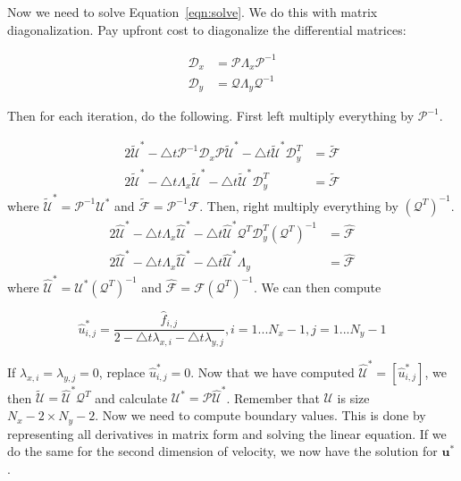 \documentclass[12pt]{article}
\begin{document}
Now we need to solve Equation~\ref{eqn:solve}. We do this with matrix diagonalization. Pay upfront cost to diagonalize the differential matrices:

\begin{align*}
    \mathcal{D}_x &= \mathcal{P}\Lambda_x \mathcal{P}^{-1} \\
    \mathcal{D}_y &= \mathcal{Q}\Lambda_y \mathcal{Q}^{-1}
\end{align*}

Then for each iteration, do the following. First left multiply everything by $\mathcal{P}^{-1}$.

\begin{align*}
    2\tilde{\mathcal{U}}^* - \bigtriangleup t \mathcal{P}^{-1}\mathcal{D}_x \mathcal{P} \tilde{\mathcal{U}}^* - \bigtriangleup t \tilde{\mathcal{U}}^* \mathcal{D}_y^T &= \tilde{\mathcal{F}} \\
    2\tilde{\mathcal{U}}^* - \bigtriangleup t \Lambda_x \tilde{\mathcal{U}}^* - \bigtriangleup t \tilde{\mathcal{U}}^* \mathcal{D}_y^T &= \tilde{\mathcal{F}}
\end{align*}
where $\tilde{\mathcal{U}}^* = \mathcal{P}^{-1} \mathcal{U}^*$ and $\tilde{\mathcal{F}} = \mathcal{P}^{-1}\mathcal{F}$. Then, right multiply everything by $(\mathcal{Q}^T)^{-1}$.
\begin{align*}
    2\hat{\mathcal{U}}^* - \bigtriangleup t \Lambda_x \hat{\mathcal{U}}^* - \bigtriangleup t \hat{\mathcal{U}}^* \mathcal{Q}^T \mathcal{D}_y^T (\mathcal{Q}^T)^{-1} &= \hat{\mathcal{F}} \\
    2\hat{\mathcal{U}}^* - \bigtriangleup t \Lambda_x \hat{\mathcal{U}}^* - \bigtriangleup t \hat{\mathcal{U}}^* \Lambda_y &= \hat{\mathcal{F}}
\end{align*}
where $\hat{\mathcal{U}}^* = \mathcal{U}^*(\mathcal{Q}^T)^{-1}$ and $\hat{\mathcal{F}} = \mathcal{F}(\mathcal{Q}^T)^{-1}$. We can then compute

\begin{equation}
    \hat{u}^*_{i,j} = \frac{\hat{f}_{i,j}}{2 - \bigtriangleup t\lambda_{x,i} - \bigtriangleup t\lambda_{y,j}}, i = 1...N_x-1,  j = 1...N_y-1
\end{equation}

If $\lambda_{x,i} = \lambda_{y,j} = 0$, replace $\hat{u}^*_{i,j} = 0$. Now that we have computed $\hat{\mathcal{U}}^* = [\hat{u}^*_{i,j}]$, we then $\tilde{\mathcal{U}} = \hat{\mathcal{U}}^*\mathcal{Q}^T$ and calculate $\mathcal{U}^* = \mathcal{P}\hat{\mathcal{U}}^*$. Remember that $\mathcal{U}$ is size $N_x-2 \times N_y-2$. Now we need to compute boundary values. This is done by representing all derivatives in matrix form and solving the linear equation. If we do the same for the second dimension of velocity, we now have the solution for $\mathbf{u}^*$.
\end{document}
